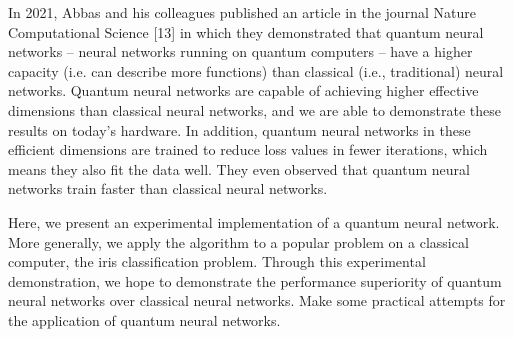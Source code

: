 \documentclass[a4paper,fleqn]{cas-dc}
\begin{document}
\begin{twocolumn}
In 2021, Abbas and his colleagues published an article in the journal Nature Computational Science [13] in which they demonstrated that quantum neural networks – neural networks running on quantum computers – have a higher capacity (i.e. can describe more functions) than classical (i.e., traditional) neural networks. Quantum neural networks are capable of achieving higher effective dimensions than classical neural networks, and we are able to demonstrate these results on today's hardware. In addition, quantum neural networks in these efficient dimensions are trained to reduce loss values in fewer iterations, which means they also fit the data well. They even observed that quantum neural networks train faster than classical neural networks.

Here, we present an experimental implementation of a quantum neural network. More generally, we apply the algorithm to a popular problem on a classical computer, the iris classification problem. Through this experimental demonstration, we hope to demonstrate the performance superiority of quantum neural networks over classical neural networks. Make some practical attempts for the application of quantum neural networks.

\printcredits


\end{twocolumn}
\end{document}
